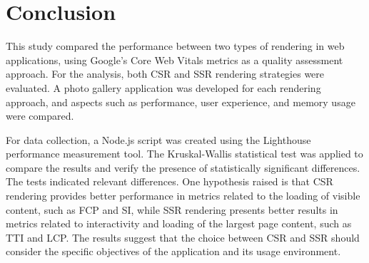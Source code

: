 \section{Conclusion}
\label{sec:conclusion}

This study compared the performance between two types of rendering in web applications, using Google's Core Web Vitals metrics as a quality assessment approach. For the analysis, both CSR and SSR rendering strategies were evaluated. A photo gallery application was developed for each rendering approach, and aspects such as performance, user experience, and memory usage were compared.

For data collection, a Node.js script was created using the Lighthouse performance measurement tool. The Kruskal-Wallis statistical test was applied to compare the results and verify the presence of statistically significant differences. The tests indicated relevant differences. One hypothesis raised is that CSR rendering provides better performance in metrics related to the loading of visible content, such as FCP and SI, while SSR rendering presents better results in metrics related to interactivity and loading of the largest page content, such as TTI and LCP. The results suggest that the choice between CSR and SSR should consider the specific objectives of the application and its usage environment.

